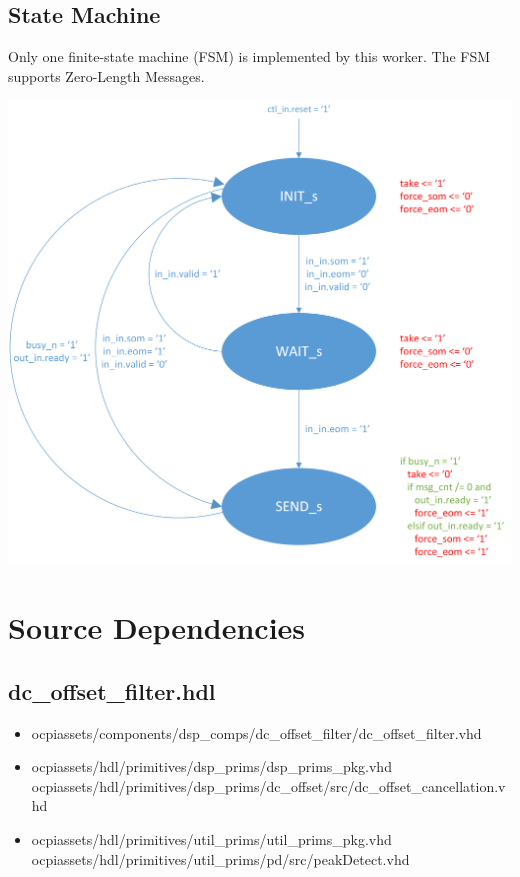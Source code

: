 \documentclass{article}
\def\comp{dc\_offset\_filter}
\begin{document}
	\subsection*{State Machine}
	\begin{flushleft}
		Only one finite-state machine (FSM) is implemented by this worker. The FSM supports Zero-Length Messages.
	\end{flushleft}
	{\centering\captionsetup{type=figure}\includegraphics[scale=0.6]{zlm_fsm}\par{}\label{fig:zlm_fsm}}
	\section*{Source Dependencies}
	\subsection*{\comp.hdl}
	\begin{itemize}
		\item ocpiassets/components/dsp\_comps/dc\_offset\_filter/dc\_offset\_filter.vhd
		\item ocpiassets/hdl/primitives/dsp\_prims/dsp\_prims\_pkg.vhd
		      \subitem ocpiassets/hdl/primitives/dsp\_prims/dc\_offset/src/dc\_offset\_cancellation.vhd
		\item ocpiassets/hdl/primitives/util\_prims/util\_prims\_pkg.vhd
		      \subitem ocpiassets/hdl/primitives/util\_prims/pd/src/peakDetect.vhd
	\end{itemize}
\end{document}
